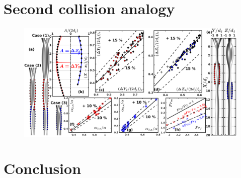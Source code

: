\documentclass{jfm}
\begin{document}
\section{Second collision analogy}
\begin{figure}
	\centering
	\includegraphics[width=\linewidth]{Figure8}
	\caption{}
	\label{Figure::secondCollision}
\end{figure}
\lipsum[1-4]
\section{Conclusion}
\lipsum[1]


\end{document}
